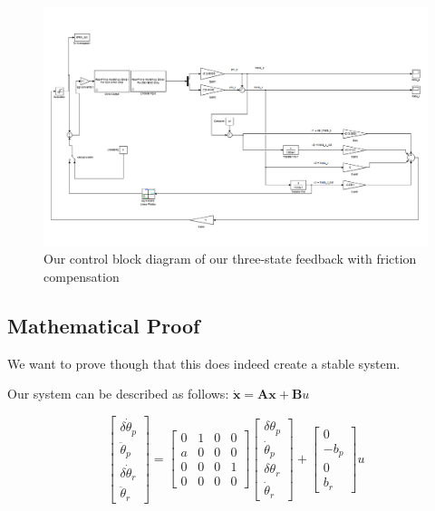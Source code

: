 \begin{figure}
  \caption{Our control block diagram of our three-state feedback with friction compensation}
  \centering
    \includegraphics[scale = 0.3]{three_state.PNG}
\end{figure}

\subsection{Mathematical Proof}
We want to prove though that this does indeed create a stable system.

Our system can be described as follows:
$\boldsymbol{\dot x = Ax+B}u$

$$
\begin{bmatrix}
\delta\dot\theta_p\\
\ddot\theta_p\\
\delta\dot\theta_r\\
\ddot\theta_r
\end{bmatrix}
=
\begin{bmatrix}
0 & 1 & 0 & 0\\
a & 0 & 0 & 0\\
0 & 0 & 0 & 1\\
0 & 0 & 0 & 0
\end{bmatrix}
\begin{bmatrix}
\delta\theta_p\\
\dot\theta_p\\
\delta\theta_r\\
\dot\theta_r
\end{bmatrix}
+
\begin{bmatrix}
0\\
-b_p\\
0\\
b_r
\end{bmatrix}
u$$

